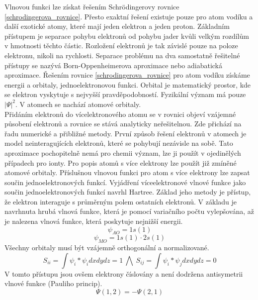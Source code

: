 \documentclass[
  digital, %
  table,   %
  lof,     %
  lot,     %
]{fithesis3}
\begin{document}
Vlnovou funkci lze získat řešením Schrödingerovy rovnice \ref{schrodingerova_rovnice}. Přesto exaktní řešení existuje pouze pro atom vodíku a další exotické atomy, které mají jeden elektron a jeden proton. Základním přístupem je separace pohybu elektronů od pohybu jader kvůli velkým rozdílům v hmotnosti těchto částic. Rozložení elektronů je tak závislé pouze na poloze elektronu, nikoli na rychlosti. Separace problému na dva samostatně řešitelné přístupy se nazývá Born-Oppenheimerova aproximace nebo adiabatická aproximace. \cite{warren1986ab}
Řešením rovnice \ref{schrodingerova_rovnice} pro atom vodíku získáme energii a orbitaly, jednoelektronovou funkci. Orbital je matematický prostor, kde se elektron vyskytuje s nejvyšší pravděpodobností. Fyzikální význam má pouze $|\Psi|^{2}$. V atomech se nachází atomové orbitaly. \\
Přidáním elektronů do vícelektronového atomu se v rovnici objeví vzájemné působení elektronů a rovnice se stává analyticky neřešitelnou. Zde přichází na řadu numerické a přibližné metody. První způsob řešení elektronů v atomech je model neinteragujících elektronů, které se pohybují nezávisle na sobě. Tato aproximace pochopitelně nemá pro chemii význam, lze ji použít v ojedinělých případech pro ionty. Pro popis atomů s více elektrony lze použít již zmíněné atomové orbitaly. Příslušnou vlnovou funkci pro atom s více elektrony lze zapsat součin jednoelektronových funkcí. Vyjádření víceelektronové vlnové funkce jako součin jednoelektronových funkcí navrhl Hartree. Základ jeho metody je přístup, že elektron interaguje s průměrným polem ostatních elektronů. V základu je navrhnuta hrubá vlnová funkce, která je pomocí variačního počtu vylepšována, až je nalezena vlnová funkce, která poskytuje nejnižší energii.
\begin{equation}
\psi_{AO} = 1s(1)
\end{equation}
\begin{equation}
\psi_{MO} = 1s(1) \cdot 2s(1)
\end{equation} 
Všechny orbitaly musí být vzájemně orthogonální a normalizované.
\begin{equation}
S_{ii} = \int \psi_i * \psi_i dx dy dz = 1 ~ \bigwedge ~ S_{ij} = \int \psi_i * \psi_j dx dy dz = 0
\end{equation}
V tomto přístupu jsou ovšem elektrony číslovány a není dodržena antisymetrii vlnové funkce (Pauliho princip). \cite{warren1986ab}
\begin{equation}
\Psi (1,2) = - \Psi (2,1)
\label{Paulliho_princip}
\end{equation}
\end{document}
